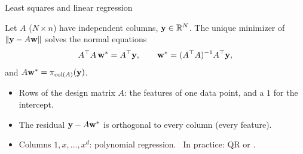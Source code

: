 \documentclass[aspectratio=1610,11pt]{beamer}
\begin{document}
\begin{frame}{Least squares and linear regression}
    \begin{theorem}
        Let $A$ ($N \times n$) have independent columns, $\mathbf{y} \in \mathbb{R}^N$. The unique minimizer of $\lVert \mathbf{y} - A\mathbf{w} \rVert$ solves the normal equations
        \[A^\top A\,\mathbf{w}^* = A^\top\mathbf{y}, \qquad \mathbf{w}^* = (A^\top A)^{-1}A^\top\mathbf{y},\]
        and $A\mathbf{w}^* = \pi_{\operatorname{col}(A)}(\mathbf{y})$.
    \end{theorem}
    \small
    \begin{itemize}
        \item Rows of the design matrix $A$: the features of one data point, and a $1$ for the intercept.
        \item The residual $\mathbf{y} - A\mathbf{w}^*$ is orthogonal to every column (every feature).
        \item Columns $1, x, \ldots, x^d$: polynomial regression. \ In practice: QR or .
    \end{itemize}
\end{frame}

\end{document}
